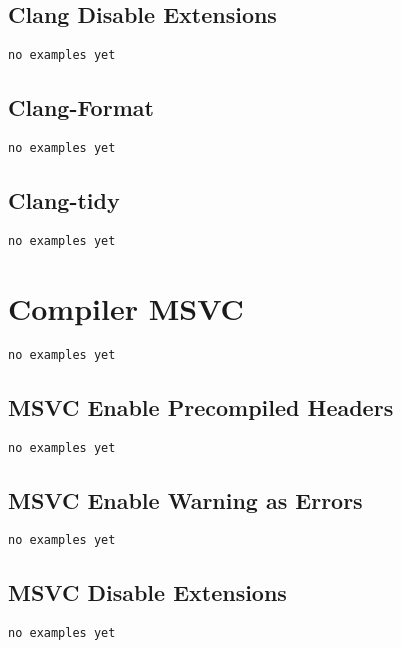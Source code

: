 \subsection{Clang Disable Extensions}

\begin{verbatim}
no examples yet
\end{verbatim}

\subsection{Clang-Format}

\begin{verbatim}
no examples yet
\end{verbatim}

\subsection{Clang-tidy}

\begin{verbatim}
no examples yet
\end{verbatim}


\section{Compiler MSVC}

\begin{verbatim}
no examples yet
\end{verbatim}

\subsection{MSVC Enable Precompiled Headers}

\begin{verbatim}
no examples yet
\end{verbatim}

\subsection{MSVC Enable Warning as Errors}

\begin{verbatim}
no examples yet
\end{verbatim}

\subsection{MSVC Disable Extensions}

\begin{verbatim}
no examples yet
\end{verbatim}
